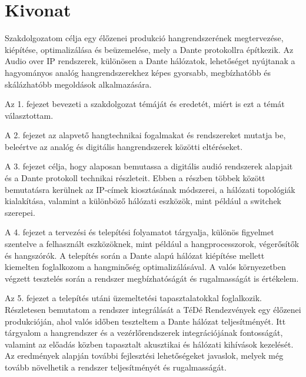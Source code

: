 \setcounter{page}{1}

\selecthungarian

\chapter*{Kivonat}

Szakdolgozatom célja egy élőzenei produkció hangrendszerének megtervezése, 
kiépítése, optimalizálása és beüzemelése, mely a Dante protokollra 
építkezik. Az Audio over IP rendszerek, különösen a Dante hálózatok, 
lehetőséget nyújtanak a hagyományos analóg hangrendszerekhez 
képes gyorsabb, megbízhatóbb és skálázhatóbb megoldások alkalmazására. 

Az 1. fejezet bevezeti a szakdolgozat témáját és eredetét,
miért is ezt a témát választottam.

A 2. fejezet az alapvető hangtechnikai fogalmakat és rendszereket 
mutatja be, beleértve az analóg és digitális hangrendszerek 
közötti eltéréseket. 

A 3. fejezet célja, hogy alaposan bemutassa a digitális audió 
rendszerek alapjait és a Dante protokoll technikai részleteit. 
Ebben a részben többek között bemutatásra kerülnek az IP-címek kiosztásának módszerei, 
a hálózati topológiák kialakítása, 
valamint a különböző hálózati eszközök, mint például a switchek szerepei.

A 4. fejezet a tervezési és telepítési folyamatot tárgyalja, 
különös figyelmet szentelve a felhasznált eszközöknek, 
mint például a hangprocesszorok, végerősítők és 
hangszórók. 
A telepítés során a Dante alapú hálózat  kiépítése mellett kiemelten
foglalkozom a hangminőség optimalizálásával. A valós környezetben 
végzett tesztelés során a rendszer megbízhatóságát és 
rugalmasságát is értékelem.

Az 5. fejezet a telepítés utáni üzemeltetési tapasztalatokkal 
foglalkozik. Részletesen bemutatom a rendszer integrálását a 
TéDé Rendezvények egy élőzenei produkcióján, ahol 
valós időben teszteltem a Dante hálózat teljesítményét. 
Itt tárgyalom a hangrendszer és a vezérlőrendszerek 
integrációjának fontosságát, valamint az előadás közben 
tapasztalt akusztikai és hálózati kihívások kezelését. 
Az eredmények alapján további fejlesztési lehetőségeket 
javaslok, melyek még tovább növelhetik a rendszer teljesítményét és rugalmasságát.


